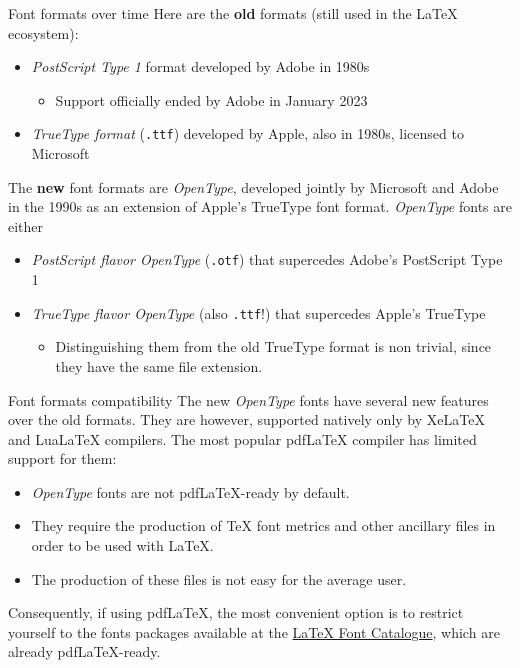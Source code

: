\documentclass{beamer}
\newcommand{\hrefcol}[2]{\textcolor{uihteal}{\href{#1}{#2}}}
\begin{document}
\begin{frame}[fragile]{Font formats over time}
Here are the \textbf{old} formats (still used in the LaTeX ecosystem):

\begin{itemize}
\item \emph{PostScript Type 1} format developed by Adobe in 1980s
\begin{itemize}
    \item Support officially ended by Adobe in January 2023
\end{itemize}
\item \emph{TrueType format} (\verb|.ttf|) developed by Apple, also in 1980s, licensed to Microsoft
\end{itemize}

The \textbf{new} font formats are \emph{OpenType}, developed jointly by Microsoft and Adobe in the 1990s as an extension of Apple's TrueType font format. \emph{OpenType} fonts are either

\begin{itemize}
\item \emph{PostScript flavor OpenType} (\verb|.otf|) that supercedes Adobe's PostScript Type 1
\item \emph{TrueType flavor OpenType} (also \verb|.ttf|!) that supercedes Apple's TrueType
    \begin{itemize}
    \item Distinguishing them from the old TrueType format is non trivial, since they have the same file extension.
    \end{itemize}
\end{itemize}
\end{frame}


\begin{frame}[fragile]{Font formats compatibility}
The new \emph{OpenType} fonts have several new features over the old formats. They are however, supported natively only by XeLaTeX and LuaLaTeX compilers. The most popular pdfLaTeX compiler has limited support for them:
\begin{itemize}
\item \emph{OpenType} fonts are not pdfLaTeX-ready by default.
\item They require the production of TeX font metrics and other ancillary files in order to be used with LaTeX.
\item The production of these files is not easy for the average user.
\end{itemize}
Consequently, if using pdfLaTeX, the most convenient option is to restrict yourself to the fonts packages available at the \hrefcol{https://tug.org/FontCatalogue/}{LaTeX Font Catalogue}, which are already pdfLaTeX-ready.
\end{frame}
\end{document}

